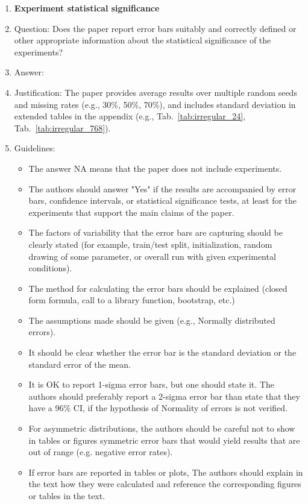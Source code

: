 \documentclass{article}
\theoremstyle{plain}
\theoremstyle{definition}
\theoremstyle{remark}
\begin{document}
{\begin{enumerate}
\item {\bf Experiment statistical significance}
    \item[] Question: Does the paper report error bars suitably and correctly defined or other appropriate information about the statistical significance of the experiments?
    \item[] Answer: \answerYes{}
    \item[] Justification: The paper provides average results over multiple random seeds and missing rates (e.g., 30\%, 50\%, 70\%), and includes standard deviation in extended tables in the appendix (e.g., Tab.~\ref{tab:irregular_24}, Tab.~\ref{tab:irregular_768}).
    \item[] Guidelines:
    \begin{itemize}
        \item The answer NA means that the paper does not include experiments.
        \item The authors should answer "Yes" if the results are accompanied by error bars, confidence intervals, or statistical significance tests, at least for the experiments that support the main claims of the paper.
        \item The factors of variability that the error bars are capturing should be clearly stated (for example, train/test split, initialization, random drawing of some parameter, or overall run with given experimental conditions).
        \item The method for calculating the error bars should be explained (closed form formula, call to a library function, bootstrap, etc.)
        \item The assumptions made should be given (e.g., Normally distributed errors).
        \item It should be clear whether the error bar is the standard deviation or the standard error of the mean.
        \item It is OK to report 1-sigma error bars, but one should state it. The authors should preferably report a 2-sigma error bar than state that they have a 96\% CI, if the hypothesis of Normality of errors is not verified.
        \item For asymmetric distributions, the authors should be careful not to show in tables or figures symmetric error bars that would yield results that are out of range (e.g. negative error rates).
        \item If error bars are reported in tables or plots, The authors should explain in the text how they were calculated and reference the corresponding figures or tables in the text.
    \end{itemize}


\end{enumerate}}
\end{document}
